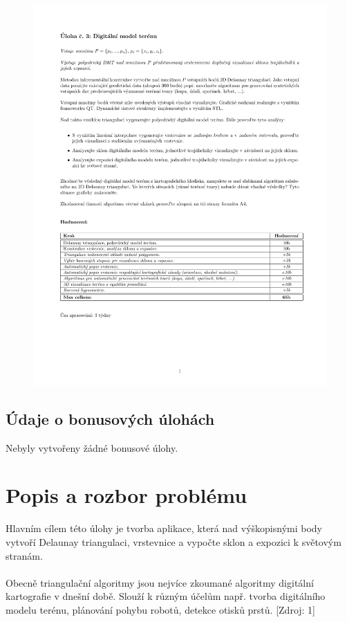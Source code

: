 \documentclass[a4paper, 12pt]{article}
\begin{document}
\begin{figure}[h!]
	\centering
	\includegraphics[clip, trim=0cm 10cm 0cm 3cm, width=1.2\textwidth]{zadani.pdf}
\end{figure}

\subsection{Údaje o bonusových úlohách}
Nebyly vytvořeny žádné bonusové úlohy.


\clearpage

\section{Popis a rozbor problému}
Hlavním cílem této úlohy je tvorba aplikace, která nad výškopisnými body vytvoří Delaunay triangulaci, vrstevnice a vypočte sklon a expozici k světovým stranám.\\
\\
Obecně triangulační algoritmy jsou nejvíce zkoumané algoritmy digitální kartografie v dnešní době. Slouží k různým účelům např. tvorba digitálního modelu terénu, plánování pohybu robotů, detekce otisků prstů.  [Zdroj: 1]
\\
\end{document}
